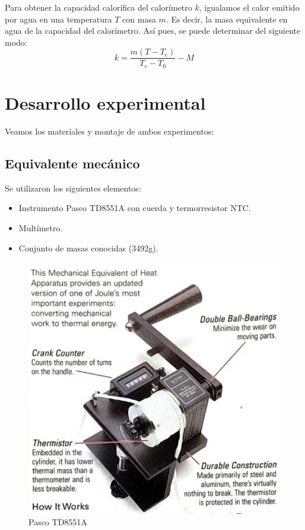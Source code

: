 \documentclass{article}
\begin{document}
Para obtener la capacidad calorífica del calorímetro $k$, igualamos el calor emitido por agua en una temperatura $T$ con masa $m$. Es decir, la masa equivalente en agua de la capacidad del calorímetro. Así pues, se puede determinar del siguiente modo\cite{scehu}:
\begin{equation}
    k = \frac{m(T - T_e)}{T_e - T_0} - M
    \label{keq}
\end{equation}

\section{Desarrollo experimental}
Veamos los materiales y montaje de ambos experimentos:

\subsection{Equivalente mecánico}
Se utilizaron los siguientes elementos: 

 \begin{itemize}
 \item Instrumento Pasco TD8551A con cuerda y termorresistor NTC.
 \item Multímetro.
 \item Conjunto de masas conocidas (3492g).
 \end{itemize}

\begin{figure}[H]
    \centering
    \includegraphics[scale=0.25]{pasco.png}
    \caption{Pasco TD8551A}
    \label{fig:pasco}
\end{figure}
\end{document}
